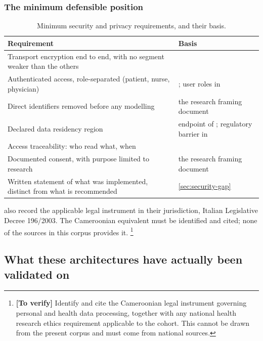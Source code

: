 \documentclass[12pt,a4paper,oneside]{report}
\newcommand{\verify}[1]{\footnote{\textbf{[To verify]} #1}}
\begin{document}
\subsubsection{The minimum defensible position}

\begin{table}[htbp]
\centering\small
\caption{Minimum security and privacy requirements, and their basis.}\label{tab:security-spec}
\begin{tabularx}{\textwidth}{@{}X >{\raggedright\arraybackslash}p{5.4cm}@{}}
\toprule
\textbf{Requirement} & \textbf{Basis} \\
\midrule
Transport encryption end to end, with no segment weaker than the others & \textcite{mucchi2021} \\
Authenticated access, role-separated (patient, nurse, physician) & \textcite{efendi2025}; user roles in \textcite{yazdani2018} \\
Direct identifiers removed before any modelling & the research framing document \\
Declared data residency region & endpoint of \textcite{efendi2025}; regulatory barrier in \textcite{dodoo2022} \\
Access traceability: who read what, when & \textcite{mucchi2021} \\
Documented consent, with purpose limited to research & the research framing document \\
Written statement of what was implemented, distinct from what is recommended & \cref{sec:security-gap} \\
\bottomrule
\end{tabularx}
\end{table}

\Textcite{mucchi2021} also record the applicable legal instrument in their jurisdiction, Italian Legislative Decree 196/2003. The Cameroonian equivalent must be identified and cited; none of the sources in this corpus provides it.%
\verify{Identify and cite the Cameroonian legal instrument governing personal and health data processing, together with any national health research ethics requirement applicable to the cohort. This cannot be drawn from the present corpus and must come from national sources.}

\subsection{What these architectures have actually been validated on}\label{sec:arch-validation}
\end{document}
